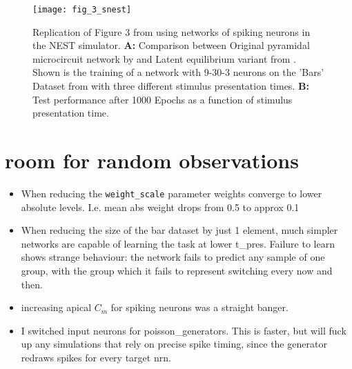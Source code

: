 \begin{figure}
    \centering
    \texttt{[image: fig\_3\_snest]}
    \caption{Replication of Figure 3 from \cite{Haider2021} using networks of spiking neurons in the NEST simulator.
        \textbf{A:} Comparison between Original pyramidal microcircuit network by \cite{sacramento2018dendritic} and 
        Latent equilibrium
        variant from \cite{Haider2021}. Shown is the training of a network with 9-30-3 neurons on the 'Bars' Dataset from
         with three different stimulus presentation times. \textbf{B:} Test performance after 1000 Epochs as a
        function of stimulus presentation time.}
    \label{fig-bars-le-snest}
\end{figure}

\begin{figure}

\end{figure}




























\chapter{room for random observations}

\begin{itemize}
    \item When reducing the \texttt{weight\_scale} parameter weights converge to lower absolute levels. I.e. mean abs
          weight drops from 0.5 to approx 0.1
    \item When reducing the size of the bar dataset by just 1 element, much simpler networks are capable of learning the
          task at lower t\_pres. Failure to learn shows strange behaviour: the network fails to predict any sample of
          one group, with the group which it fails to represent switching every now and then.
    \item increasing apical $C_m$ for spiking neurons was a straight banger.
    \item I switched input neurons for poisson\_generators. This is faster, but will fuck up any simulations that rely
          on precise spike timing, since the generator redraws spikes for every target nrn.
\end{itemize}